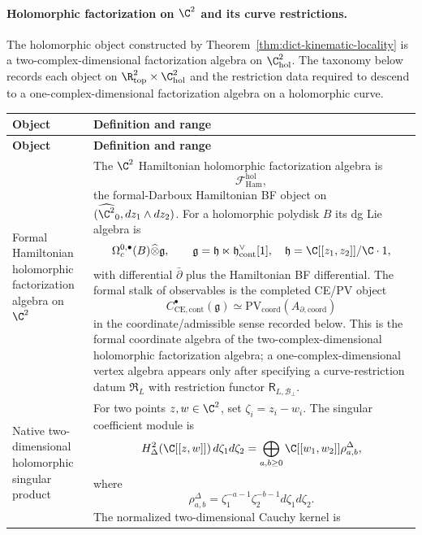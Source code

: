 \paragraph{\texorpdfstring{Holomorphic factorization on \(\C^2\) and its curve
restrictions.}{Holomorphic factorization on 2 and its curve restrictions}}
The holomorphic object constructed by
Theorem~\ref{thm:dict-kinematic-locality} is a
two-complex-dimensional factorization algebra on
\(\C^2_{\mathrm{hol}}\).  The taxonomy below records each object on
\(\R^2_{\mathrm{top}}\times\C^2_{\mathrm{hol}}\) and the restriction
data required to descend to a one-complex-dimensional factorization
algebra on a holomorphic curve.
\begin{longtable}{@{}>{\raggedright\arraybackslash}p{}
  >{\raggedright\arraybackslash}p{}@{}}
\hline
\textbf{Object} & \textbf{Definition and range}\\
\hline
\endfirsthead
\hline
\textbf{Object} & \textbf{Definition and range}\\
\hline
\endhead
Formal Hamiltonian holomorphic factorization algebra on \(\C^2\) &
The \(\C^2\) Hamiltonian holomorphic factorization algebra is
\[
  \mathcal F_{\mathrm{Ham}}^{\mathrm{hol}},
\]
the formal-Darboux Hamiltonian BF object on
\((\widehat{\C^2}_0,dz_1\wedge dz_2)\).  For a holomorphic polydisk
\(B\) its dg Lie algebra is
\[
  \Omega^{0,\bullet}_c(B)\widehat\otimes
  \mathfrak g,\qquad
  \mathfrak g=\mathfrak h\ltimes
  \mathfrak h^\vee_{\mathrm{cont}}[1],
  \quad
  \mathfrak h=\C[[z_1,z_2]]/\C\cdot1 ,
\]
with differential \(\bar\partial\) plus the Hamiltonian BF differential.
The formal stalk of observables is the completed CE/PV object
\[
  C^\bullet_{\mathrm{CE},\mathrm{cont}}(\mathfrak g)
  \simeq
  \mathrm{PV}_{\mathrm{coord}}(A_{\partial,\mathrm{coord}})
\]
in the coordinate/admissible sense recorded below.  This is the formal
coordinate algebra of the two-complex-dimensional holomorphic
factorization algebra; a
one-complex-dimensional vertex algebra appears only after specifying a
curve-restriction datum \(\mathfrak R_L\) with restriction functor
\(\mathsf R_{L,\mathcal B_\perp}\).\\
\hline
Native two-dimensional holomorphic singular product &
For two points \(z,w\in\C^2\), set \(\zeta_i=z_i-w_i\).  The singular
coefficient module is
\[
  H^2_\Delta(\C[[z,w]])\,d\zeta_1d\zeta_2
  =
  \bigoplus_{a,b\ge0}\C[[w_1,w_2]]\rho^\Delta_{a,b},
\]
where
\[
  \rho^\Delta_{a,b}
  =
  \zeta_1^{-a-1}\zeta_2^{-b-1}d\zeta_1d\zeta_2 .
\]
The normalized two-dimensional Cauchy kernel is

\end{longtable}
